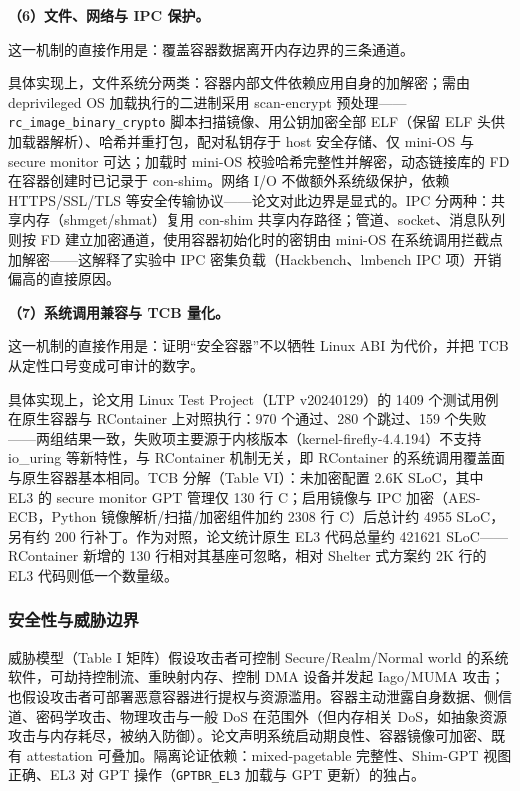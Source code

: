 \documentclass[11pt]{ctexart}
\begin{document}
\noindent\textbf{（6）文件、网络与 IPC 保护。}\par
这一机制的直接作用是：覆盖容器数据离开内存边界的三条通道。\par
具体实现上，文件系统分两类：容器内部文件依赖应用自身的加解密；需由 deprivileged OS 加载执行的二进制采用 scan-encrypt 预处理——\texttt{rc\_image\_binary\_crypto} 脚本扫描镜像、用公钥加密全部 ELF（保留 ELF 头供加载器解析）、哈希并重打包，配对私钥存于 host 安全存储、仅 mini-OS 与 secure monitor 可达；加载时 mini-OS 校验哈希完整性并解密，动态链接库的 FD 在容器创建时已记录于 con-shim。网络 I/O 不做额外系统级保护，依赖 HTTPS/SSL/TLS 等安全传输协议——论文对此边界是显式的。IPC 分两种：共享内存（shmget/shmat）复用 con-shim 共享内存路径；管道、socket、消息队列则按 FD 建立加密通道，使用容器初始化时的密钥由 mini-OS 在系统调用拦截点加解密——这解释了实验中 IPC 密集负载（Hackbench、lmbench IPC 项）开销偏高的直接原因。\par
\noindent\textbf{（7）系统调用兼容与 TCB 量化。}\par
这一机制的直接作用是：证明“安全容器”不以牺牲 Linux ABI 为代价，并把 TCB 从定性口号变成可审计的数字。\par
具体实现上，论文用 Linux Test Project（LTP v20240129）的 1409 个测试用例在原生容器与 RContainer 上对照执行：970 个通过、280 个跳过、159 个失败——两组结果一致，失败项主要源于内核版本（kernel-firefly-4.4.194）不支持 io\_uring 等新特性，与 RContainer 机制无关，即 RContainer 的系统调用覆盖面与原生容器基本相同。TCB 分解（Table VI）：未加密配置 2.6K SLoC，其中 EL3 的 secure monitor GPT 管理仅 130 行 C；启用镜像与 IPC 加密（AES-ECB，Python 镜像解析/扫描/加密组件加约 2308 行 C）后总计约 4955 SLoC，另有约 200 行补丁。作为对照，论文统计原生 EL3 代码总量约 421621 SLoC——RContainer 新增的 130 行相对其基座可忽略，相对 Shelter 式方案约 2K 行的 EL3 代码则低一个数量级。\par
\subsubsection{安全性与威胁边界}
威胁模型（Table I 矩阵）假设攻击者可控制 Secure/Realm/Normal world 的系统软件，可劫持控制流、重映射内存、控制 DMA 设备并发起 Iago/MUMA 攻击；也假设攻击者可部署恶意容器进行提权与资源滥用。容器主动泄露自身数据、侧信道、密码学攻击、物理攻击与一般 DoS 在范围外（但内存相关 DoS，如抽象资源攻击与内存耗尽，被纳入防御）。论文声明系统启动期良性、容器镜像可加密、既有 attestation 可叠加。隔离论证依赖：mixed-pagetable 完整性、Shim-GPT 视图正确、EL3 对 GPT 操作（\texttt{GPTBR\_EL3} 加载与 GPT 更新）的独占。\par
\end{document}
